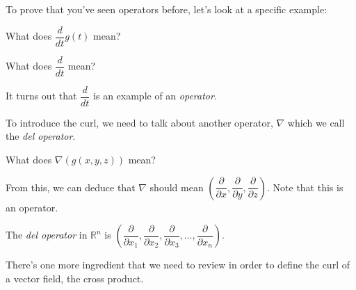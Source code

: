 \documentclass{ximera}
\begin{document}
To prove that you've seen operators before, let's look at a specific example:
\begin{problem}
What does $\dfrac{d}{dt}g(t)$ mean?
\begin{multipleChoice}
\end{multipleChoice}
\begin{problem}
What does $\dfrac{d}{dt}$ mean?
\begin{multipleChoice}
\end{multipleChoice}
\begin{problem}
It turns out that $\dfrac{d}{dt}$ is an example of an \emph{operator}.

To introduce the curl, we need to talk about another operator, $\nabla$ which we call the \emph{del operator}.

What does $\nabla (g(x,y,z))$ mean?
\begin{multipleChoice}
\end{multipleChoice}

\begin{problem}
From this, we can deduce that $\nabla$ should mean $\left(\dfrac{\partial}{\partial x}, \dfrac{\partial}{\partial y}, \dfrac{\partial}{\partial z}\right)$. Note that this is an operator.
\end{problem}
\end{problem}
\end{problem}
\end{problem}

\begin{definition}
The \emph{del operator} in $\mathbb{R}^n$ is $\left(\dfrac{\partial}{\partial x_1}, \dfrac{\partial}{\partial x_2}, \dfrac{\partial}{\partial x_3},...,\dfrac{\partial}{\partial x_n}\right)$.
\end{definition}

There's one more ingredient that we need to review in order to define the curl of a vector field, the cross product.
\end{document}
